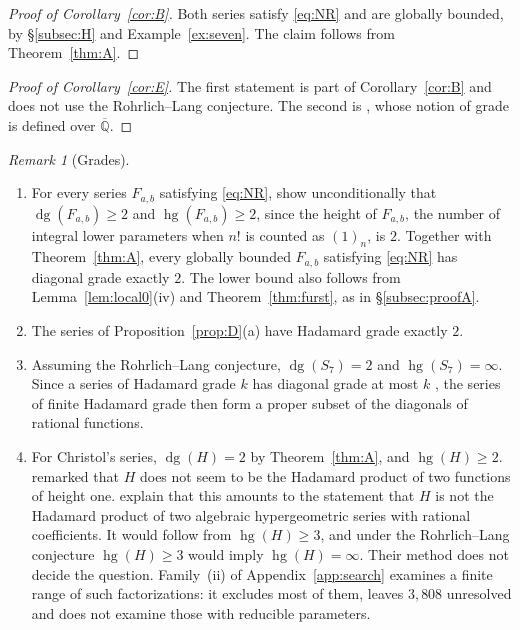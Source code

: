 \documentclass[11pt]{amsart}
\theoremstyle{definition}
\theoremstyle{remark}
\newtheorem{remark}[theorem]{Remark}
\numberwithin{equation}{section}
\newcommand{\Qb}{\overline{\mathbb{Q}}}
\DeclareMathOperator{\hg}{hg}
\DeclareMathOperator{\dg}{dg}
\newcommand{\Fab}{F_{a,b}}
\begin{document}
\begin{proof}[Proof of Corollary~\ref{cor:B}]
Both series satisfy \eqref{eq:NR} and are globally bounded, by \S\ref{subsec:H} and Example~\ref{ex:seven}. The claim follows from Theorem~\ref{thm:A}.
\end{proof}

\begin{proof}[Proof of Corollary~\ref{cor:E}]
The first statement is part of Corollary~\ref{cor:B} and does not use the Rohrlich--Lang conjecture. The second is \citet[Proposition~1]{RivoalRoques2014}, whose notion of grade is defined over $\Qb$.
\end{proof}

\begin{remark}[Grades]\label{rem:grades}
\begin{enumerate}[label=(\arabic*),leftmargin=2em]
\item For every series $\Fab$ satisfying \eqref{eq:NR}, \citet[Theorem~3.7]{HarderKramerMiller2026} show unconditionally that $\dg(\Fab)\ge2$ and $\hg(\Fab)\ge2$, since the height of $\Fab$, the number of integral lower parameters when $n!$ is counted as $(1)_n$, is $2$. Together with Theorem~\ref{thm:A}, every globally bounded $\Fab$ satisfying \eqref{eq:NR} has diagonal grade exactly $2$. The lower bound also follows from Lemma~\ref{lem:local0}(iv) and Theorem~\ref{thm:furst}, as in \S\ref{subsec:proofA}.
\item The series of Proposition~\ref{prop:D}(a) have Hadamard grade exactly $2$.
\item Assuming the Rohrlich--Lang conjecture, $\dg(S_7)=2$ and $\hg(S_7)=\infty$. Since a series of Hadamard grade $k$ has diagonal grade at most $k$ \citep[Proposition~4.1]{HarderKramerMiller2026}, the series of finite Hadamard grade then form a proper subset of the diagonals of rational functions.
\item For Christol's series, $\dg(H)=2$ by Theorem~\ref{thm:A}, and $\hg(H)\ge2$. \citet[\S VII]{Christol1987} remarked that $H$ does not seem to be the Hadamard product of two functions of height one. \citet[\S10]{RivoalRoques2014} explain that this amounts to the statement that $H$ is not the Hadamard product of two algebraic hypergeometric series with rational coefficients. It would follow from $\hg(H)\ge3$, and under the Rohrlich--Lang conjecture $\hg(H)\ge3$ would imply $\hg(H)=\infty$. Their method does not decide the question. Family~(ii) of Appendix~\ref{app:search} examines a finite range of such factorizations: it excludes most of them, leaves $3{,}808$ unresolved and does not examine those with reducible parameters.
\end{enumerate}
\end{remark}
\end{document}

